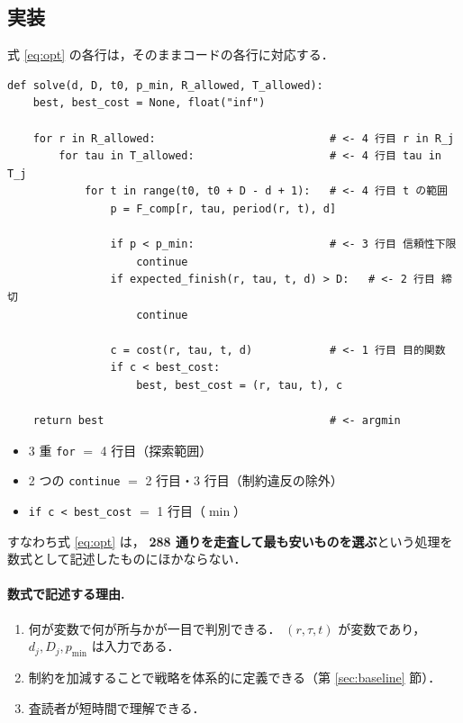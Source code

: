 \documentclass[11pt,a4paper]{ltjsarticle}
\begin{document}
\subsection{実装}

式 \eqref{eq:opt} の各行は，そのままコードの各行に対応する．

\begin{lstlisting}
def solve(d, D, t0, p_min, R_allowed, T_allowed):
    best, best_cost = None, float("inf")

    for r in R_allowed:                           # <- 4 行目 r in R_j
        for tau in T_allowed:                     # <- 4 行目 tau in T_j
            for t in range(t0, t0 + D - d + 1):   # <- 4 行目 t の範囲
                p = F_comp[r, tau, period(r, t), d]

                if p < p_min:                     # <- 3 行目 信頼性下限
                    continue
                if expected_finish(r, tau, t, d) > D:   # <- 2 行目 締切
                    continue

                c = cost(r, tau, t, d)            # <- 1 行目 目的関数
                if c < best_cost:
                    best, best_cost = (r, tau, t), c

    return best                                   # <- argmin
\end{lstlisting}

\begin{itemize}
  \item 3 重 \texttt{for} $=$ 4 行目（探索範囲）
  \item 2 つの \texttt{continue} $=$ 2 行目・3 行目（制約違反の除外）
  \item \texttt{if c < best\_cost} $=$ 1 行目（$\min$）
\end{itemize}

すなわち式 \eqref{eq:opt} は，
\textbf{288 通りを走査して最も安いものを選ぶ}という処理を
数式として記述したものにほかならない．

\paragraph{数式で記述する理由.}
\begin{enumerate}
  \item 何が変数で何が所与かが一目で判別できる．
        $(r,\tau,t)$ が変数であり，$d_j, D_j, p_{\min}$ は入力である．
  \item 制約を加減することで戦略を体系的に定義できる（第 \ref{sec:baseline} 節）．
  \item 査読者が短時間で理解できる．
\end{enumerate}
\end{document}
